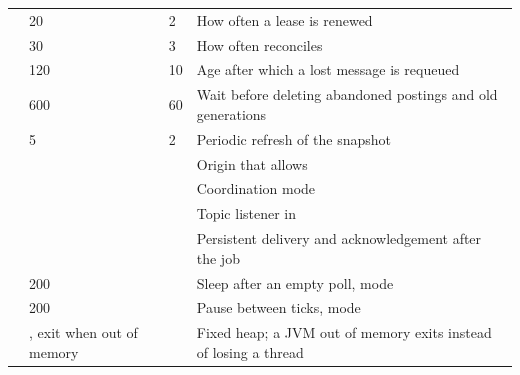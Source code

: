 \begin{table}[!ht]
\begin{tabularx}{\textwidth}{@{}L{5.55cm}L{2.75cm}L{1.3cm}Y@{}}
 & 20 & 2 & How often a lease is renewed \\
 & 30 & 3 & How often  reconciles \\
 & 120 & 10 & Age after which a lost message is requeued \\
 & 600 & 60 & Wait before deleting abandoned postings and old generations \\
 & 5 & 2 & Periodic refresh of the  snapshot \\
 & \code{*} & & Origin that  allows \\
 &  & & Coordination mode \\
 &  & & Topic listener in  \\
 &  & & Persistent delivery and acknowledgement after the job \\
 & 200 & & Sleep after an empty poll, mode  \\
 & 200 & & Pause between ticks, mode  \\
 & , exit when out of memory & & Fixed heap; a JVM out of memory exits instead of losing a thread \\
\bottomrule
\end{tabularx}
\end{table}
